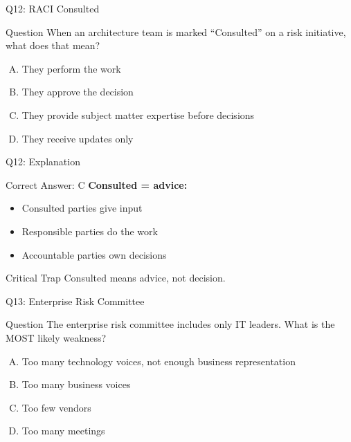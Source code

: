 \documentclass{beamer}
\begin{document}
	\begin{frame}{Q12: RACI Consulted}
		\begin{block}{Question}
			When an architecture team is marked ``Consulted'' on a risk initiative, what does that mean?
		\end{block}
		\begin{enumerate}[(A)]
			\item They perform the work
			\item They approve the decision
			\item They provide subject matter expertise before decisions
			\item They receive updates only
		\end{enumerate}
	\end{frame}
	
	\begin{frame}{Q12: Explanation}
		\begin{block}{Correct Answer: C}
			\textbf{Consulted = advice:}
			\begin{itemize}
				\item Consulted parties give input
				\item Responsible parties do the work
				\item Accountable parties own decisions
			\end{itemize}
		\end{block}
		\begin{alertblock}{Critical Trap}
			Consulted means advice, not decision.
		\end{alertblock}
	\end{frame}
	
	\begin{frame}{Q13: Enterprise Risk Committee}
		\begin{block}{Question}
			The enterprise risk committee includes only IT leaders. What is the MOST likely weakness?
		\end{block}
		\begin{enumerate}[(A)]
			\item Too many technology voices, not enough business representation
			\item Too many business voices
			\item Too few vendors
			\item Too many meetings
		\end{enumerate}
	\end{frame}
	
\end{document}
